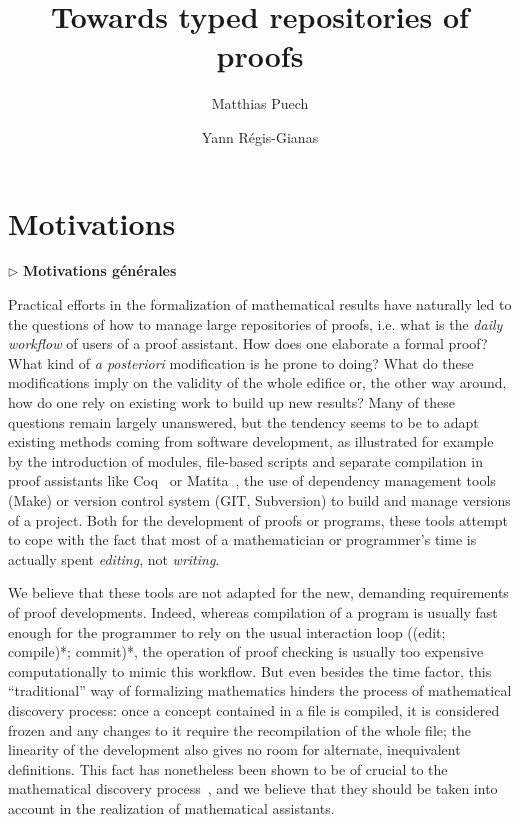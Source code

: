 \documentclass{article}
\title{Towards typed repositories of proofs}
\author{Matthias Puech \and Yann Régis-Gianas}
\date{}
\newcommand{\remplan}[1]{\noindent\textcolor{bwblue}{$\triangleright$ \textbf{#1}}}
\begin{document}
\maketitle

\section{Motivations}

\remplan{Motivations générales}

Practical efforts in the formalization of mathematical results have
naturally led to the questions of how to manage large repositories of
proofs, i.e. what is the \emph{daily workflow} of users of a proof
assistant. How does one elaborate a formal proof? What kind of \emph{a
  posteriori} modification is he prone to doing? What do these
modifications imply on the validity of the whole edifice or, the other
way around, how do one rely on existing work to build up new results?
Many of these questions remain largely unanswered, but the tendency
seems to be to adapt existing methods coming from software
development, as illustrated for example by the introduction of
modules, file-based scripts and separate compilation in proof
assistants like \textsf{Coq}~{\cite{CoqDocWeb}} or
\textsf{Matita}~{\cite{Asperti06userinteraction}}, the use of
dependency management tools (\textsf{Make}) or version control system
(\textsf{GIT}, \textsf{Subversion}) to build and manage versions of a
project. Both for the development of proofs or programs, these tools
attempt to cope with the fact that most of a mathematician or
programmer's time is actually spent \emph{editing}, not
\emph{writing}.

We believe that these tools are not adapted for the new, demanding
requirements of proof developments. Indeed, whereas compilation of a
program is usually fast enough for the programmer to rely on the usual
interaction loop ((edit; compile)*; commit)*, the operation of proof
checking is usually too expensive computationally to mimic this
workflow. But even besides the time factor, this ``traditional'' way
of formalizing mathematics hinders the process of mathematical
discovery process: once a concept contained in a file is compiled, it
is considered frozen and any changes to it require the recompilation
of the whole file; the linearity of the development also gives no room
for alternate, inequivalent definitions. This fact has nonetheless
been shown to be of crucial to the mathematical discovery
process~\cite{lakatos1964proofs}, and we believe that they should be
taken into account in the realization of mathematical assistants.
\end{document}

